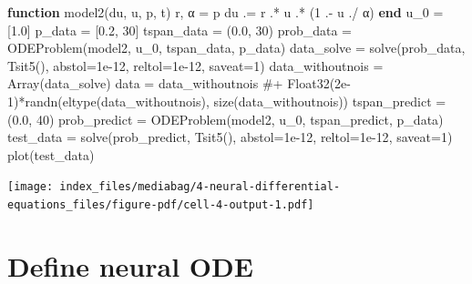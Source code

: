 \documentclass[
  letterpaper,
  DIV=11,
  numbers=noendperiod]{scrreport}
\newenvironment{Shaded}{\begin{snugshade}}{\end{snugshade}}
\newcommand{\CommentTok}[1]{\textcolor[rgb]{0.37,0.37,0.37}{#1}}
\newcommand{\FloatTok}[1]{\textcolor[rgb]{0.68,0.00,0.00}{#1}}
\newcommand{\FunctionTok}[1]{\textcolor[rgb]{0.28,0.35,0.67}{#1}}
\newcommand{\KeywordTok}[1]{\textcolor[rgb]{0.00,0.23,0.31}{\textbf{#1}}}
\newcommand{\NormalTok}[1]{\textcolor[rgb]{0.00,0.23,0.31}{#1}}
\newcommand{\OperatorTok}[1]{\textcolor[rgb]{0.37,0.37,0.37}{#1}}
\begin{document}
\begin{Shaded}
\begin{Highlighting}[]
\KeywordTok{function} \FunctionTok{model2}\NormalTok{(du, u, p, t)}
\NormalTok{    r, α }\OperatorTok{=}\NormalTok{ p}
\NormalTok{    du }\OperatorTok{.=}\NormalTok{ r }\OperatorTok{.*}\NormalTok{ u }\OperatorTok{.*}\NormalTok{ (}\FloatTok{1} \OperatorTok{.{-}}\NormalTok{ u }\OperatorTok{./}\NormalTok{ α)}
\KeywordTok{end}
\NormalTok{u\_0 }\OperatorTok{=}\NormalTok{ [}\FloatTok{1.0}\NormalTok{]}
\NormalTok{p\_data }\OperatorTok{=}\NormalTok{ [}\FloatTok{0.2}\NormalTok{, }\FloatTok{30}\NormalTok{]}
\NormalTok{tspan\_data }\OperatorTok{=}\NormalTok{ (}\FloatTok{0.0}\NormalTok{, }\FloatTok{30}\NormalTok{)}
\NormalTok{prob\_data }\OperatorTok{=} \FunctionTok{ODEProblem}\NormalTok{(model2, u\_0, tspan\_data, p\_data)}
\NormalTok{data\_solve }\OperatorTok{=} \FunctionTok{solve}\NormalTok{(prob\_data, }\FunctionTok{Tsit5}\NormalTok{(), abstol}\OperatorTok{=}\FloatTok{1e{-}12}\NormalTok{, reltol}\OperatorTok{=}\FloatTok{1e{-}12}\NormalTok{, saveat}\OperatorTok{=}\FloatTok{1}\NormalTok{)}
\NormalTok{data\_withoutnois }\OperatorTok{=} \FunctionTok{Array}\NormalTok{(data\_solve)}
\NormalTok{data }\OperatorTok{=}\NormalTok{ data\_withoutnois }\CommentTok{\#+ Float32(2e{-}1)*randn(eltype(data\_withoutnois), size(data\_withoutnois))}
\NormalTok{tspan\_predict }\OperatorTok{=}\NormalTok{ (}\FloatTok{0.0}\NormalTok{, }\FloatTok{40}\NormalTok{)}
\NormalTok{prob\_predict }\OperatorTok{=} \FunctionTok{ODEProblem}\NormalTok{(model2, u\_0, tspan\_predict, p\_data)}
\NormalTok{test\_data }\OperatorTok{=} \FunctionTok{solve}\NormalTok{(prob\_predict, }\FunctionTok{Tsit5}\NormalTok{(), abstol}\OperatorTok{=}\FloatTok{1e{-}12}\NormalTok{, reltol}\OperatorTok{=}\FloatTok{1e{-}12}\NormalTok{, saveat}\OperatorTok{=}\FloatTok{1}\NormalTok{)}
\FunctionTok{plot}\NormalTok{(test\_data)}
\end{Highlighting}
\end{Shaded}

\texttt{[image: index\_files/mediabag/4-neural-differential-equations\_files/figure-pdf/cell-4-output-1.pdf]}

\section{Define neural ODE}\label{define-neural-ode}
\end{document}
